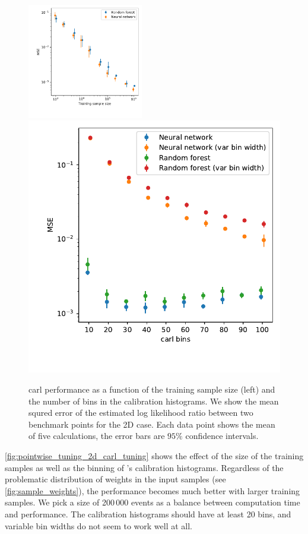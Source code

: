 \begin{figure}
  \includegraphics[width=0.45\textwidth]{figures/pointwise_tuning_2d/mse_training_sample_size.pdf}%
  \includegraphics[height=0.45\textwidth]{figures/pointwise_tuning_2d/mse_carl_bins.pdf}%
  \caption{carl performance as a function of the training sample size
    (left) and the number of bins in the  calibration
    histograms.  We show the mean squred error of the estimated log
    likelihood ratio between two benchmark points for the 2D
    case. Each data point shows the mean of five calculations, the
    error bars are $95\%$ confidence intervals.}
  \label{fig:pointwise_tuning_2d_carl_tuning}
\end{figure}

\autoref{fig:pointwise_tuning_2d_carl_tuning} shows the effect of the
size of the training samples as well as the binning of
's calibration histograms.  Regardless of the
problematic distribution of weights in the input samples (see
\autoref{fig:sample_weights}), the performance becomes much better
with larger training samples. We pick a size of 200\,000 events as a
balance between computation time and performance. The calibration
histograms should have at least 20 bins, and variable bin widths do
not seem to work well at all.

